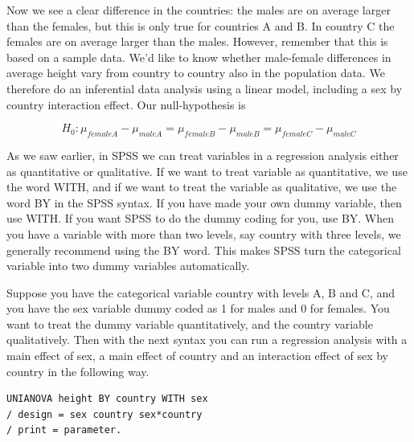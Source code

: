\documentclass[]{report}\usepackage[]{graphicx}\usepackage[]{color}
\makeatletter
\newenvironment{kframe}{%
 \def\at@end@of@kframe{}%
 \ifinner\ifhmode%
  \def\at@end@of@kframe{\end{minipage}}%
  \begin{minipage}{\columnwidth}%
 \fi\fi%
 \def\FrameCommand##1{\hskip\@totalleftmargin \hskip-\fboxsep
 \colorbox{shadecolor}{##1}\hskip-\fboxsep
     \hskip-\linewidth \hskip-\@totalleftmargin \hskip\columnwidth}%
 \MakeFramed {\advance\hsize-\width
   \@totalleftmargin\z@ \linewidth\hsize
   \@setminipage}}%
 {\par\unskip\endMakeFramed%
 \at@end@of@kframe}
\newenvironment{knitrout}{}{} %
\makeatother
\begin{document}
\begin{knitrout}
\color{fgcolor}\begin{kframe}


{\ttfamily\noindent\bfseries{}}\end{kframe}
\end{knitrout}

Now we see a clear difference in the countries: the males are on average larger than the females, but this is only true for countries A and B. In country C the females are on average larger than the males. However, remember that this is based on a sample data. We'd like to know whether male-female differences in average height vary from country to country also in the population data. We therefore do an inferential data analysis using a linear model, including a sex by country interaction effect. Our null-hypothesis is 

\begin{equation}
H_0: \mu_{femaleA}-\mu_{maleA}=\mu_{femaleB}-\mu_{maleB}=\mu_{femaleC}-\mu_{maleC}
\end{equation}


As we saw earlier, in SPSS we can treat variables in a regression analysis either as quantitative or qualitative. If we want to treat variable as quantitative, we use the word WITH, and if we want to treat the variable as qualitative, we use the word BY in the SPSS syntax. If you have made your own dummy variable, then use WITH. If you want SPSS to do the dummy coding for you, use BY. When you have a variable with more than two levels, say country with three levels, we generally recommend using the BY word. This makes SPSS turn the categorical variable into two dummy variables automatically. 

Suppose you have the categorical variable country with levels A, B and C, and you have the sex variable dummy coded as 1 for males and 0 for females. You want to treat the dummy variable quantitatively, and the country variable qualitatively. Then with the next syntax you can run a regression analysis with a main effect of sex, a main effect of country and an interaction effect of sex by country in the following way.

\begin{verbatim}
UNIANOVA height BY country WITH sex 
/ design = sex country sex*country
/ print = parameter.
\end{verbatim}
\end{document}
